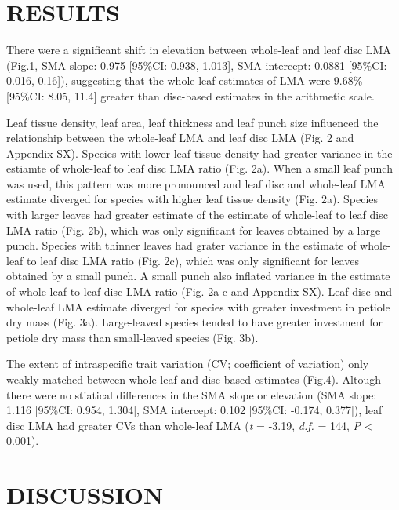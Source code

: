 \documentclass[
  12pt,
  a4paper,
,tablecaptionabove
]{scrartcl}
\begin{document}
\hypertarget{results}{%
\section{RESULTS}\label{results}}

There were a significant shift in elevation between whole-leaf and leaf disc LMA (Fig.1, SMA slope: 0.975 {[}95\%CI: 0.938, 1.013{]}, SMA intercept: 0.0881 {[}95\%CI: 0.016, 0.16{]}), suggesting that the whole-leaf estimates of LMA were 9.68\% {[}95\%CI: 8.05, 11.4{]} greater than disc-based estimates in the arithmetic scale.

Leaf tissue density, leaf area, leaf thickness and leaf punch size influenced the relationship between the whole-leaf LMA and leaf disc LMA (Fig. 2 and Appendix SX).
Species with lower leaf tissue density had greater variance in the estiamte of whole-leaf to leaf disc LMA ratio (Fig. 2a).
When a small leaf punch was used, this pattern was more pronounced and leaf disc and whole-leaf LMA estimate diverged for species with higher leaf tissue density (Fig. 2a).
Species with larger leaves had greater estimate of the estimate of whole-leaf to leaf disc LMA ratio (Fig. 2b), which was only significant for leaves obtained by a large punch.
Species with thinner leaves had grater variance in the estimate of whole-leaf to leaf disc LMA ratio (Fig. 2c), which was only significant for leaves obtained by a small punch.
A small punch also inflated variance in the estimate of whole-leaf to leaf disc LMA ratio (Fig. 2a-c and Appendix SX).
Leaf disc and whole-leaf LMA estimate diverged for species with greater investment in petiole dry mass (Fig. 3a). Large-leaved species tended to have greater investment for petiole dry mass than small-leaved species (Fig. 3b).

The extent of intraspecific trait variation (CV; coefficient of variation) only weakly matched between whole-leaf and disc-based estimates (Fig.4).
Altough there were no stiatical differences in the SMA slope or elevation (SMA slope: 1.116 {[}95\%CI: 0.954, 1.304{]}, SMA intercept: 0.102 {[}95\%CI: -0.174, 0.377{]}), leaf disc LMA had greater CVs than whole-leaf LMA (\emph{t} = -3.19, \emph{d.f.} = 144, \emph{P} \textless{} 0.001).

\hypertarget{discussion}{%
\section{DISCUSSION}\label{discussion}}
\end{document}

